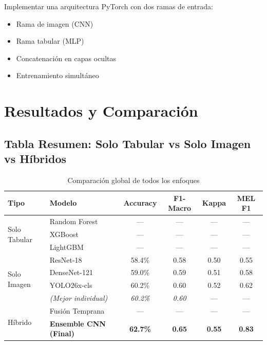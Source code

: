\documentclass[12pt,a4paper]{article}
\begin{document}
\begin{pendiente}
Implementar una arquitectura PyTorch con dos ramas de entrada:
\begin{itemize}
    \item Rama de imagen (CNN)
    \item Rama tabular (MLP)
    \item Concatenación en capas ocultas
    \item Entrenamiento simultáneo
\end{itemize}
\end{pendiente}

\newpage

\section{Resultados y Comparación}

\subsection{Tabla Resumen: Solo Tabular vs Solo Imagen vs Híbridos}

\begin{table}[H]
\centering
\begin{tabular}{llcccc}
\toprule
\textbf{Tipo} & \textbf{Modelo} & \textbf{Accuracy} & \textbf{F1-Macro} & \textbf{Kappa} & \textbf{MEL F1} \\
\midrule
\multirow{3}{*}{Solo Tabular}
& Random Forest & --- & --- & --- & --- \\
& XGBoost & --- & --- & --- & --- \\
& LightGBM & --- & --- & --- & --- \\
\midrule
\multirow{4}{*}{Solo Imagen}
& ResNet-18 & 58.4\% & 0.58 & 0.50 & 0.55 \\
& DenseNet-121 & 59.0\% & 0.59 & 0.51 & 0.58 \\
& YOLO26x-cls & 60.2\% & 0.60 & 0.52 & 0.62 \\
& \textit{(Mejor individual)} & \textit{60.2\%} & \textit{0.60} & --- & --- \\
\midrule
\multirow{2}{*}{Híbrido}
& Fusión Temprana & --- & --- & --- & --- \\
& \textbf{Ensemble CNN (Final)} & \textbf{62.7\%} & \textbf{0.65} & \textbf{0.55} & \textbf{0.83} \\
\bottomrule
\end{tabular}
\caption{Comparación global de todos los enfoques}
\label{tab:comparacion_global}
\end{table}
\end{document}
